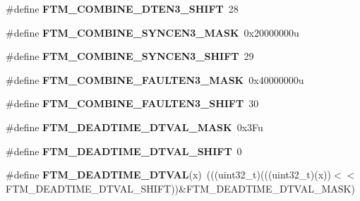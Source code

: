 \begin{DoxyCompactItemize}
\item 
\#define {\bfseries F\+T\+M\+\_\+\+C\+O\+M\+B\+I\+N\+E\+\_\+\+D\+T\+E\+N3\+\_\+\+S\+H\+I\+FT}~28\hypertarget{group__FTM__Register__Masks_ga0534a71643db31f180f6918d19ad3409}{}\label{group__FTM__Register__Masks_ga0534a71643db31f180f6918d19ad3409}

\item 
\#define {\bfseries F\+T\+M\+\_\+\+C\+O\+M\+B\+I\+N\+E\+\_\+\+S\+Y\+N\+C\+E\+N3\+\_\+\+M\+A\+SK}~0x20000000u\hypertarget{group__FTM__Register__Masks_ga9e631b38ed9e6cbf3a3afa812db96c21}{}\label{group__FTM__Register__Masks_ga9e631b38ed9e6cbf3a3afa812db96c21}

\item 
\#define {\bfseries F\+T\+M\+\_\+\+C\+O\+M\+B\+I\+N\+E\+\_\+\+S\+Y\+N\+C\+E\+N3\+\_\+\+S\+H\+I\+FT}~29\hypertarget{group__FTM__Register__Masks_ga429ad5d8c1f8afa7450531c8c0d6421d}{}\label{group__FTM__Register__Masks_ga429ad5d8c1f8afa7450531c8c0d6421d}

\item 
\#define {\bfseries F\+T\+M\+\_\+\+C\+O\+M\+B\+I\+N\+E\+\_\+\+F\+A\+U\+L\+T\+E\+N3\+\_\+\+M\+A\+SK}~0x40000000u\hypertarget{group__FTM__Register__Masks_ga2f56f45afa6694ded2489432d0be896f}{}\label{group__FTM__Register__Masks_ga2f56f45afa6694ded2489432d0be896f}

\item 
\#define {\bfseries F\+T\+M\+\_\+\+C\+O\+M\+B\+I\+N\+E\+\_\+\+F\+A\+U\+L\+T\+E\+N3\+\_\+\+S\+H\+I\+FT}~30\hypertarget{group__FTM__Register__Masks_ga85e6b9e11f73ef2ae12870399dbc99a6}{}\label{group__FTM__Register__Masks_ga85e6b9e11f73ef2ae12870399dbc99a6}

\item 
\#define {\bfseries F\+T\+M\+\_\+\+D\+E\+A\+D\+T\+I\+M\+E\+\_\+\+D\+T\+V\+A\+L\+\_\+\+M\+A\+SK}~0x3\+Fu\hypertarget{group__FTM__Register__Masks_ga8fdaa69c3721ec4a328fadcc00d4f4df}{}\label{group__FTM__Register__Masks_ga8fdaa69c3721ec4a328fadcc00d4f4df}

\item 
\#define {\bfseries F\+T\+M\+\_\+\+D\+E\+A\+D\+T\+I\+M\+E\+\_\+\+D\+T\+V\+A\+L\+\_\+\+S\+H\+I\+FT}~0\hypertarget{group__FTM__Register__Masks_ga40e02c81ec12ef23c0ce633feaf03d1a}{}\label{group__FTM__Register__Masks_ga40e02c81ec12ef23c0ce633feaf03d1a}

\item 
\#define {\bfseries F\+T\+M\+\_\+\+D\+E\+A\+D\+T\+I\+M\+E\+\_\+\+D\+T\+V\+AL}(x)~(((uint32\+\_\+t)(((uint32\+\_\+t)(x))$<$$<$F\+T\+M\+\_\+\+D\+E\+A\+D\+T\+I\+M\+E\+\_\+\+D\+T\+V\+A\+L\+\_\+\+S\+H\+I\+FT))\&F\+T\+M\+\_\+\+D\+E\+A\+D\+T\+I\+M\+E\+\_\+\+D\+T\+V\+A\+L\+\_\+\+M\+A\+SK)\hypertarget{group__FTM__Register__Masks_ga3a313efb41a03923ef2e16146fb31ab2}{}\label{group__FTM__Register__Masks_ga3a313efb41a03923ef2e16146fb31ab2}


\end{DoxyCompactItemize}
